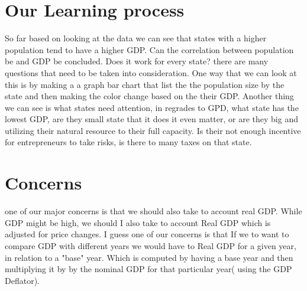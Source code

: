 \documentclass{article}
\begin{document}
\section{Our Learning process}

So far based on looking at the data we can see that states with a higher population tend to have a higher GDP. Can the correlation between population be and GDP be concluded. Does it work for every state? there are many questions that need to be taken into consideration. One way that we can look at this is by making a a graph bar chart that list the the population size by the state and then making the color change based on the their GDP.  Another thing we can see is what states need attention, in regrades to GPD, what state has the lowest GDP, are they small state that it does it even matter, or are they big and utilizing their natural resource to their full capacity. Is their not enough incentive for entrepreneurs to take risks, is there to many taxes on that state. 


\section{Concerns}

one of our major concerns is that we should also take to account real GDP. While GDP  might be  high, we should I also take to account Real GDP which is adjusted for price changes. I guess one of our concerns is that If we to want to compare GDP with different years we would have to Real GDP for a given year, in relation to a "base" year. Which is computed by having a base year and then multiplying it by by the nominal GDP for that particular year( using the GDP Deflator).  
\end{document}
